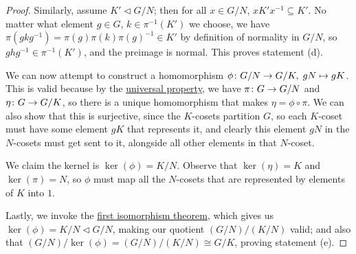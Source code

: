 \begin{proof}
    \medskip

    Similarly, assume \(K' \lhd G/N\);
    then for all \(x \in G/N\), \(xK'x^{-1} \subseteq K'\).
    No matter what element \(g \in G\), \(k \in \pi^{-1}(K')\) we choose,
    we have \(\pi(gkg^{-1}) = \pi(g)\pi(k){\pi(g)}^{-1} \in K'\)
    by definition of normality in \(G/N\),
    so \(ghg^{-1} \in \pi^{-1}(K')\),
    and the preimage is normal.
    This proves statement (d).

    \medskip
    
    We can now attempt to construct a homomorphism
    \(\phi\colon G/N\to G/K,\;gN\mapsto gK\).
    This is valid because
    by the \hyperref[thm:univ-prop-quotient-group]{universal property},
    we have \(\pi\colon G\to G/N\) and \(\eta\colon G\to G/K\),
    so there is a unique homomorphism that makes \(\eta = \phi\circ\pi\).
    We can also show that this is surjective,
    since the \(K\)-cosets partition \(G\),
    so each \(K\)-coset must have some element \(gK\)
    that represents it,
    and clearly this element \(gN\) in the \(N\)-cosets
    must get sent to it,
    alongside all other elements in that \(N\)-coset.

    We claim the kernel is \(\ker(\phi) = K/N\).
    Observe that \(\ker(\eta) = K\) and \(\ker(\pi) = N\),
    so \(\phi\) must map all the \(N\)-cosets
    that are represented by elements of \(K\) into \(1\).

    Lastly, we invoke the \hyperref[thm:iso-1-group]{first isomorphism theorem},
    which gives us \(\ker(\phi) = K/N \lhd G/N\),
    making our quotient \((G/N)/(K/N)\) valid;
    and also that \((G/N)/\ker(\phi) = (G/N)/(K/N) \cong G/K\),
    proving statement (e).
\end{proof}

